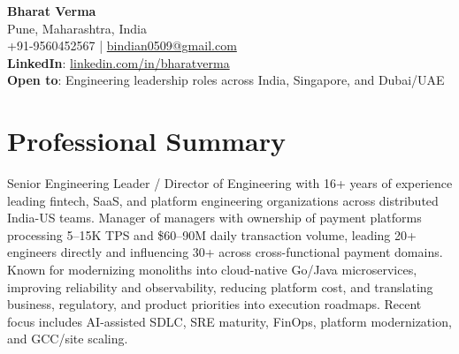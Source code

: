 \documentclass[11pt,a4paper]{article}
\begin{document}
\begin{center}
{\Large \textbf{Bharat Verma}}\\
Pune, Maharashtra, India \\
+91-9560452567 \quad | \quad \href{mailto:bindian0509@gmail.com}{bindian0509@gmail.com} \\
\textbf{LinkedIn}: \href{https://linkedin.com/in/bharatverma}{linkedin.com/in/bharatverma}
\\
\textbf{Open to}: Engineering leadership roles across India, Singapore, and Dubai/UAE
\end{center}

\vspace{4pt}

\section*{Professional Summary}
Senior Engineering Leader / Director of Engineering with 16+ years of experience leading fintech, SaaS, and platform engineering organizations across distributed India-US teams. Manager of managers with ownership of payment platforms processing 5--15K TPS and \$60--90M daily transaction volume, leading 20+ engineers directly and influencing 30+ across cross-functional payment domains. Known for modernizing monoliths into cloud-native Go/Java microservices, improving reliability and observability, reducing platform cost, and translating business, regulatory, and product priorities into execution roadmaps. Recent focus includes AI-assisted SDLC, SRE maturity, FinOps, platform modernization, and GCC/site scaling.

\vspace{2pt}

\end{document}
